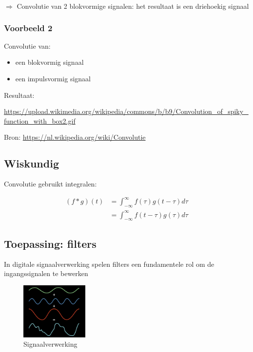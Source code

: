 \documentclass{article}
\begin{document}
$\Rightarrow$ Convolutie van 2 blokvormige signalen: het resultaat is een driehoekig signaal

\subsubsection{Voorbeeld 2}

Convolutie van:

\begin{itemize}
    \item een blokvormig signaal
    \item een impulsvormig signaal
\end{itemize}

Resultaat: 

\url{https://upload.wikimedia.org/wikipedia/commons/b/b9/Convolution_of_spiky_function_with_box2.gif}

Bron: \url{https://nl.wikipedia.org/wiki/Convolutie}

\subsection{Wiskundig}

Convolutie gebruikt integralen:

\begin{equation}
    \begin{aligned}
        (f * g)(t) &= \int_{-\infty}^{\infty} f(\tau) g(t-\tau) d{\tau}\\
        &= \int_{-\infty}^{\infty} f(t - \tau) g (\tau) d{\tau}
    \end{aligned}
\end{equation}


\subsection{Toepassing: filters}

In digitale signaalverwerking spelen filters een fundamentele rol om de ingangssignalen te bewerken

\begin{figure}[H]
    \centering
    \includegraphics[width=0.3\textwidth]{convolutie-filters.png}
    \caption{Signaalverwerking}
\end{figure}
\end{document}
